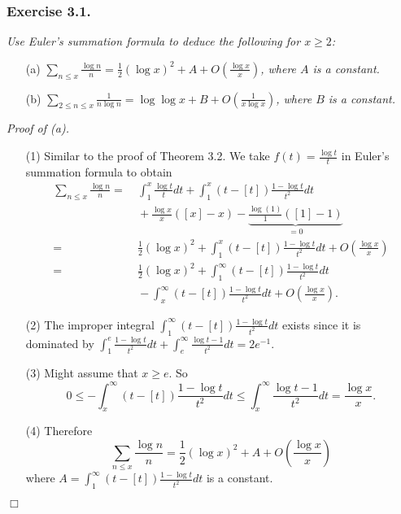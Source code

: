 \documentclass{article}
\begin{document}
\subsubsection*{Exercise 3.1.}
\emph{Use Euler's summation formula to deduce the following for $x \geq 2$:}
\begin{enumerate}
\item[(a)]
  \emph{$\sum_{n \leq x} \frac{\log n}{n}
  = \frac{1}{2} (\log x)^2 + A + O\left( \frac{\log x}{x} \right)$,
  where $A$ is a constant.}

\item[(b)]
  \emph{$\sum_{2 \leq n \leq x} \frac{1}{n\log n}
  = \log\log x + B + O\left( \frac{1}{x\log x} \right)$,
  where $B$ is a constant.} \\
\end{enumerate}



\emph{Proof of (a).}
\begin{enumerate}
\item[(1)]
  Similar to the proof of Theorem 3.2.
  We take $f(t) = \frac{\log t}{t}$ in Euler's summation formula to obtain
  \begin{align*}
    \sum_{n \leq x} \frac{\log n}{n}
    = & \: \int_{1}^{x} \frac{\log t}{t} dt
        + \int_{1}^{x}(t-[t])\frac{1-\log t}{t^2} dt \\
      & \: + \frac{\log x}{x}([x]-x) - \underbrace{\frac{\log(1)}{1}([1]-1)}_{= 0} \\
    = & \: \frac{1}{2} (\log x)^2
        + \int_{1}^{x}(t-[t])\frac{1-\log t}{t^2} dt + O\left( \frac{\log x}{x} \right) \\
    = & \: \frac{1}{2} (\log x)^2 + \int_{1}^{\infty}(t-[t])\frac{1-\log t}{t^2} dt \\
      & \: - \int_{x}^{\infty}(t-[t])\frac{1-\log t}{t^2} dt + O\left( \frac{\log x}{x} \right).
  \end{align*}

\item[(2)]
  The improper integral $\int_{1}^{\infty}(t-[t])\frac{1-\log t}{t^2} dt$
  exists since it is dominated by
  $\int_{1}^{e} \frac{1-\log t}{t^2} dt + \int_{e}^{\infty} \frac{\log t - 1}{t^2} dt = 2e^{-1}$.

\item[(3)]
  Might assume that $x \geq e$.
  So
  \[
    0
    \leq -\int_{x}^{\infty}(t-[t])\frac{1-\log t}{t^2} dt
    \leq \int_{x}^{\infty}\frac{\log t - 1}{t^2} dt
    = \frac{\log x}{x}.
  \]

\item[(4)]
  Therefore
  \[
    \sum_{n \leq x} \frac{\log n}{n}
    = \frac{1}{2} (\log x)^2 + A + O\left( \frac{\log x}{x} \right)
  \]
  where $A = \int_{1}^{\infty}(t-[t])\frac{1-\log t}{t^2} dt$ is a constant.
\end{enumerate}
$\Box$ \\
\end{document}
